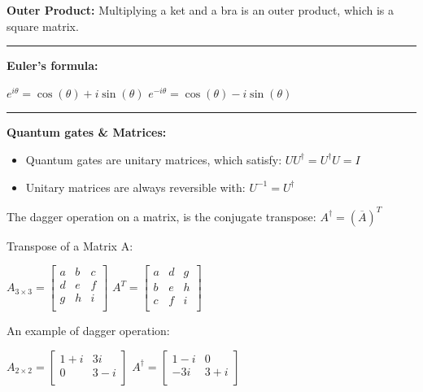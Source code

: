\documentclass{article}
\begin{document}
\textbf{Outer Product:} Multiplying a ket and a bra is an outer product, which is a square matrix.

\vspace{5pt}
\hrule 
\vspace{5pt}


\textbf{Euler's formula:}
\begin{center}
$ e^{i\theta} = \cos(\theta) + i\sin(\theta) $
\qquad
$ e^{-i\theta} = \cos(\theta) - i\sin(\theta) $
\end{center}

\vspace{5pt}
\hrule
\vspace{5pt}


\textbf{Quantum gates \& Matrices:}

\begin{itemize}
	\item Quantum gates are unitary matrices, which satisfy: $UU^\dagger = U^\dagger U = I$
	\item Unitary matrices are always reversible with: $U^{-1} = U^\dagger$
\end{itemize}

The dagger operation on a matrix, is the conjugate transpose:  $A^\dagger= (\overline{A})^T$

Transpose of a Matrix A:
\begin{center}
$
  A_{3\times3} =
  \left[ {\begin{array}{ccc}
    a & b & c \\
    d & e & f \\
    g & h & i \\
  \end{array} } \right]
$
\qquad
$
  A^T =
  \left[ {\begin{array}{ccc}
    a & d & g \\
    b & e & h \\
    c & f & i \\
  \end{array} } \right]
$
\end{center}

An example of dagger operation:

\begin{center}
$
  A_{2\times2} =
  \left[ {\begin{array}{cc}
    1 + i & 3i \\
    0 & 3 - i \\
  \end{array} } \right]
$
\qquad
$
  A^\dagger =
  \left[ {\begin{array}{cc}
    1 -i & 0 \\
    -3i & 3 + i \\
  \end{array} } \right]
$
\end{center}
\end{document}

